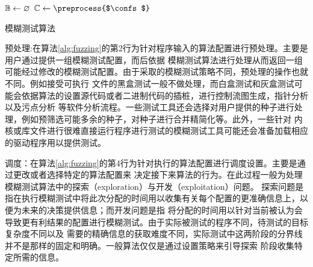 \documentclass[bachelor]{njupthesis}
\begin{document}
\begin{algorithm}[H]
	\KwIn{\confs, \timeout}
	$\mathbb{B} \gets \varnothing$\;
	$\confs \gets \preprocess{$\confs$}$\;
	\Return{\bugs}\;
	\caption[short]{模糊测试算法}\label{alg:fuzzing} 
\end{algorithm} 
\vspace{6pt}
预处理:在算法\ref{alg:fuzzing}的第2行为针对程序输入的算法配置进行预处理。主要是用户通过提供一组模糊测试配置，而后依据
模糊测试算法进行处理从而返回一组可能经过修改的模糊测试配置。由于采取的模糊测试策略不同，预处理的操作也就不同。例如接受可执行
文件的黑盒测试一般不做处理，而白盒测试和灰盒测试可能会依据算法的设置源代码或者二进制代码的插桩，进行控制流图生成，指针分析以及污点分析
等软件分析流程。一些测试工具还会选择对用户提供的种子进行处理，例如预筛选可能多余的种子，对种子进行合并精简化等。此外，一些针对
内核或库文件进行很难直接运行程序进行测试的模糊测试工具可能还会准备加载相应的驱动程序用以提供测试。

调度：在算法\ref{alg:fuzzing}的第4行为针对执行的算法配置进行调度设置。主要是通过更改或者选择特定的算法配置来
决定接下来算法的行为。在此过程一般为处理模糊测试算法中的探索（exploration）与开发（exploitation）问题。
探索问题是指在执行模糊测试中将此次分配的时间用以收集有关每个配置的更准确信息上，以便为未来的决策提供信息；而开发问题是指
将分配的时间用以针对当前被认为会导致更有利结果的配置进行模糊测试。由于实际被测试的程序不同，待测试的目标复杂度不同以及
需要的精确信息的获取难度不同，实际测试中这两阶段的分界线并不是那样的固定和明确。一般算法仅仅是通过设置策略来引导探索
阶段收集特定所需的信息。
\end{document}
